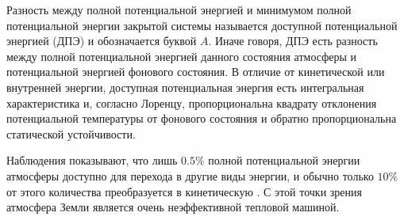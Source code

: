 Разность между полной потенциальной энергией и минимумом полной потенциальной энергии закрытой системы называется доступной потенциальной энергией (ДПЭ) и обозначается буквой $A$. Иначе говоря, ДПЭ есть разность между полной потенциальной энергией данного состояния атмосферы и потенциальной энергией фонового состояния. В отличие от кинетической или внутренней энергии, доступная потенциальная энергия есть интегральная характеристика и, согласно Лоренцу, пропорциональна квадрату отклонения потенциальной температуры от фонового состояния и обратно пропорциональна статической устойчивости. 

Наблюдения показывают, что лишь $0.5\%$ полной потенциальной энергии атмосферы доступно для перехода в другие виды энергии, и обычно только $10\%$ от этого количества преобразуется в кинетическую \citep{Holton2004}. С этой точки зрения атмосфера Земли является очень неэффективной тепловой машиной. 

